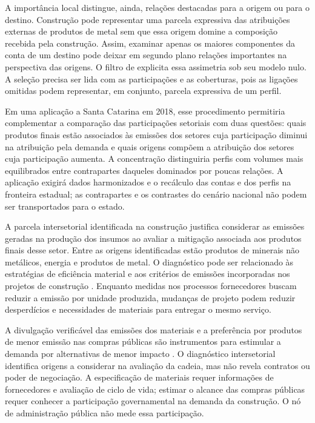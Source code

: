 \documentclass[12pt]{article}
\begin{document}
A importância local distingue, ainda, relações destacadas para a origem ou para o destino. Construção pode representar uma parcela expressiva das atribuições externas de produtos de metal sem que essa origem domine a composição recebida pela construção. Assim, examinar apenas os maiores componentes da conta de um destino pode deixar em segundo plano relações importantes na perspectiva das origens. O filtro de \textcite{serrano2009} explicita essa assimetria sob seu modelo nulo. A seleção precisa ser lida com as participações e as coberturas, pois as ligações omitidas podem representar, em conjunto, parcela expressiva de um perfil.

Em uma aplicação a Santa Catarina em 2018, esse procedimento permitiria complementar a comparação das participações setoriais com duas questões: quais produtos finais estão associados às emissões dos setores cuja participação diminui na atribuição pela demanda e quais origens compõem a atribuição dos setores cuja participação aumenta. A concentração distinguiria perfis com volumes mais equilibrados entre contrapartes daqueles dominados por poucas relações. A aplicação exigirá dados harmonizados e o recálculo das contas e dos perfis na fronteira estadual; as contrapartes e os contrastes do cenário nacional não podem ser transportados para o estado.

A parcela intersetorial identificada na construção justifica considerar as emissões geradas na produção dos insumos ao avaliar a mitigação associada aos produtos finais desse setor. Entre as origens identificadas estão produtos de minerais não metálicos, energia e produtos de metal. O diagnóstico pode ser relacionado às estratégias de eficiência material e aos critérios de emissões incorporadas nos projetos de construção \parencite[seções~5.1 e~6.4]{rissman2020}. Enquanto medidas nos processos fornecedores buscam reduzir a emissão por unidade produzida, mudanças de projeto podem reduzir desperdícios e necessidades de materiais para entregar o mesmo serviço.

A divulgação verificável das emissões dos materiais e a preferência por produtos de menor emissão nas compras públicas são instrumentos para estimular a demanda por alternativas de menor impacto \parencite[seções~6.6 e~6.7]{rissman2020}. O diagnóstico intersetorial identifica origens a considerar na avaliação da cadeia, mas não revela contratos ou poder de negociação. A especificação de materiais requer informações de fornecedores e avaliação de ciclo de vida; estimar o alcance das compras públicas requer conhecer a participação governamental na demanda da construção. O nó de administração pública não mede essa participação.
\end{document}

